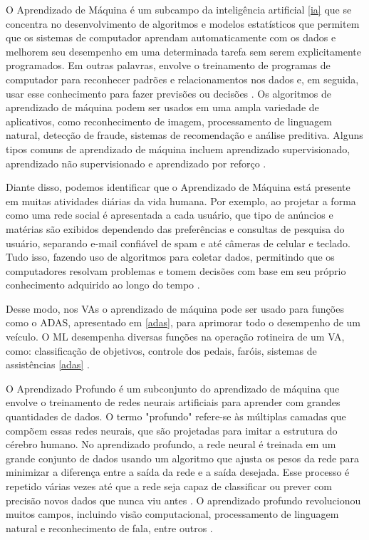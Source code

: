 O Aprendizado de Máquina é um subcampo da inteligência artificial \ref{ia} que se concentra no desenvolvimento de algoritmos e modelos estatísticos que permitem que os sistemas de computador aprendam automaticamente com os dados e melhorem seu desempenho em uma determinada tarefa sem serem explicitamente programados. Em outras palavras, envolve o treinamento de programas de computador para reconhecer padrões e relacionamentos nos dados e, em seguida, usar esse conhecimento para fazer previsões ou decisões \cite{review-auto}. Os algoritmos de aprendizado de máquina podem ser usados em uma ampla variedade de aplicativos, como reconhecimento de imagem, processamento de linguagem natural, detecção de fraude, sistemas de recomendação e análise preditiva. Alguns tipos comuns de aprendizado de máquina incluem aprendizado supervisionado, aprendizado não supervisionado e aprendizado por reforço \cite{software-review, software-cnn}.

Diante disso, podemos identificar que o Aprendizado de Máquina está presente em muitas atividades diárias da vida humana. Por exemplo, ao projetar a forma como uma rede social é apresentada a cada usuário, que tipo de anúncios e matérias são exibidos dependendo das preferências e consultas de pesquisa do usuário, separando e-mail confiável de spam e até câmeras de celular e teclado. Tudo isso, fazendo uso de algoritmos para coletar dados, permitindo que os computadores resolvam problemas e tomem decisões com base em seu próprio conhecimento adquirido ao longo do tempo \cite{caio}. 

Desse modo, nos VAs o aprendizado de máquina pode ser usado para funções como o ADAS, apresentado em \ref{adas}, para aprimorar todo o desempenho de um veículo. O ML desempenha diversas funções na operação rotineira de um VA, como: classificação de objetivos, controle dos pedais, faróis, sistemas de assistências \ref{adas} \cite{aplicacao2}.

 \label{Profunda}

O Aprendizado Profundo é um subconjunto do aprendizado de máquina que envolve o treinamento de redes neurais artificiais para aprender com grandes quantidades de dados. O termo "profundo" refere-se às múltiplas camadas que compõem essas redes neurais, que são projetadas para imitar a estrutura do cérebro humano. No aprendizado profundo, a rede neural é treinada em um grande conjunto de dados usando um algoritmo que ajusta os pesos da rede para minimizar a diferença entre a saída da rede e a saída desejada. Esse processo é repetido várias vezes até que a rede seja capaz de classificar ou prever com precisão novos dados que nunca viu antes \cite{software-cnn}. O aprendizado profundo revolucionou muitos campos, incluindo visão computacional, processamento de linguagem natural e reconhecimento de fala, entre outros \cite{review-auto, software-review}. 

